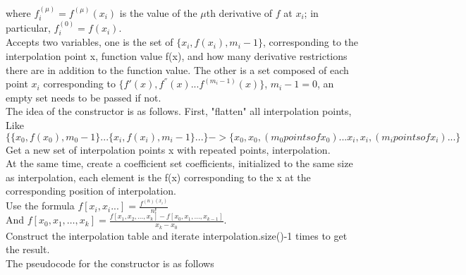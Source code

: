 \documentclass[a4paper]{article}
\begin{document}
where $f_{i}^{(\mu)}=f^{(\mu)}(x_{i})$ is the value of the $\mu$th derivative of $f$ at $x_{i}$; in particular, $f_{i}^{(0)}=f(x_{i})$. \\
Accepts two variables, one is the set of $\{x_i,f(x_i),m_i-1\}$, corresponding to the interpolation point x, function value f(x), and how many derivative restrictions there are in addition to the function value. The other is a set composed of each point $x_i$ corresponding to $\{f'(x),f^{''}(x)...f^{(m_i-1)}(x)\}$, $m_i-1=0$, an empty set needs to be passed if not. \\
The idea of the constructor is as follows. First, "flatten" all interpolation points, \\
Like $\{\{x_0,f(x_0),m_0-1\}...\{x_i,f(x_i),m_i-1\}...\}->\{x_0,x_0,(m_0 points of x_0)...x_i,x_i,(m_i points of x_i)...\}$ \\
Get a new set of interpolation points x with repeated points, interpolation. \\
At the same time, create a coefficient set coefficients, initialized to the same size as interpolation, each element is the f(x) corresponding to the x at the corresponding position of interpolation. \\
Use the formula $f[x_i,x_i...]=\frac{f^{(n)(x_i)}}{n!}$ \\
And $f[x_{0},x_{1},\ldots,x_{k}] = \frac{f[x_{1},x_{2},\ldots,x_{k}] - f[x_{0},x_{1},\ldots,x_{k-1}]}{x_{k} - x_{0}}.$ \\
Construct the interpolation table and iterate interpolation.size()-1 times to get the result. \\
The pseudocode for the constructor is as follows \\
\end{document}
